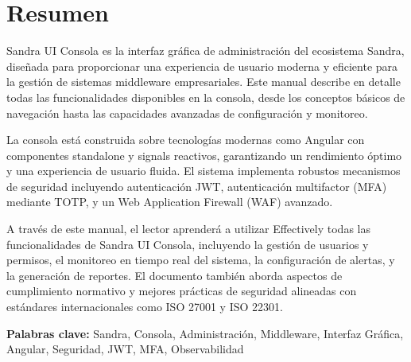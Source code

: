 
\chapter*{Resumen}

Sandra UI Consola es la interfaz gráfica de administración del ecosistema Sandra, diseñada para proporcionar una experiencia de usuario moderna y eficiente para la gestión de sistemas middleware empresariales. Este manual describe en detalle todas las funcionalidades disponibles en la consola, desde los conceptos básicos de navegación hasta las capacidades avanzadas de configuración y monitoreo.

La consola está construida sobre tecnologías modernas como Angular con componentes standalone y signals reactivos, garantizando un rendimiento óptimo y una experiencia de usuario fluida. El sistema implementa robustos mecanismos de seguridad incluyendo autenticación JWT, autenticación multifactor (MFA) mediante TOTP, y un Web Application Firewall (WAF) avanzado.

A través de este manual, el lector aprenderá a utilizar Effectively todas las funcionalidades de Sandra UI Consola, incluyendo la gestión de usuarios y permisos, el monitoreo en tiempo real del sistema, la configuración de alertas, y la generación de reportes. El documento también aborda aspectos de cumplimiento normativo y mejores prácticas de seguridad alineadas con estándares internacionales como ISO 27001 y ISO 22301.

\textbf{Palabras clave:} Sandra, Consola, Administración, Middleware, Interfaz Gráfica, Angular, Seguridad, JWT, MFA, Observabilidad

\clearpage
